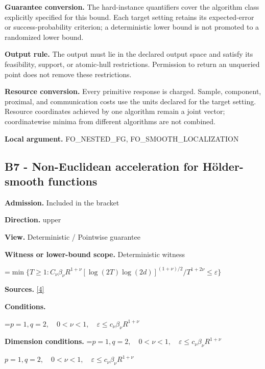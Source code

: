 \documentclass[10pt,a4paper]{article}
\newcommand{\AtlasMath}[1]{\par\begingroup\centering\setbox0=\hbox{$\displaystyle #1$}\ifdim\wd0>1.4\linewidth\typeout{ATLAS WIDE FORMULA: \the\wd0}\fi\ifdim\wd0>\linewidth\resizebox{\linewidth}{!}{\box0}\else\box0\fi\par\endgroup}
\newcommand{\AtlasInlineMath}[1]{\begingroup\setbox0=\hbox{$#1$}\ifdim\wd0>.4\linewidth\endgroup\AtlasMath{#1}\else\endgroup$#1$\fi}
\begin{document}
\textbf{Guarantee conversion.} The hard-instance quantifiers cover the algorithm class explicitly specified for this bound. Each target setting retains its expected-error or success-probability criterion; a deterministic lower bound is not promoted to a randomized lower bound.



\textbf{Output rule.} The output must lie in the declared output space and satisfy its feasibility, support, or atomic-hull restrictions. Permission to return an unqueried point does not remove these restrictions.



\textbf{Resource conversion.} Every primitive response is charged. Sample, component, proximal, and communication costs use the units declared for the target setting. Resource coordinates achieved by one algorithm remain a joint vector; coordinatewise minima from different algorithms are not combined.



\textbf{Local argument.} FO\_NESTED\_FG, FO\_SMOOTH\_LOCALIZATION



\subsection{B7 - Non-Euclidean acceleration for Hölder-smooth functions}


\textbf{Admission.} Included in the bracket



\textbf{Direction.} upper



\textbf{View.} Deterministic / Pointwise guarantee



\textbf{Witness or lower-bound scope.} Deterministic witness



\AtlasMath{\min\{T\ge1:C_\nu\beta_\nu R^{1+\nu}[\log(2T)\log(2d)]^{(1+\nu)/2}/T^{1+2\nu}\le\varepsilon\}}


\textbf{Sources.} \href{https://arxiv.org/pdf/2609.32910}{[4]}



\textbf{Conditions.}
\AtlasMath{p=1,q=2,\quad0<\nu<1,\quad\varepsilon\le c_\nu\beta_\nu R^{1+\nu}}




\textbf{Dimension conditions.} \AtlasInlineMath{p=1,q=2,\quad0<\nu<1,\quad\varepsilon\le c_\nu\beta_\nu R^{1+\nu}}
\end{document}
